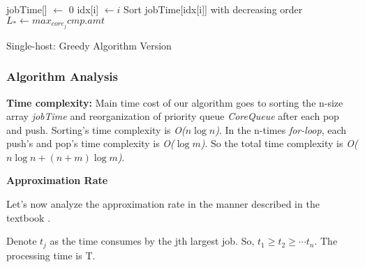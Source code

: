 \documentclass{article}
\begin{document}
    \begin{center}
        \begin{minipage}{15cm}
        \begin{algorithm}[H]
            \SetAlgoLined
            jobTime[] $\leftarrow$ 0 \; 
            idx[i] $\leftarrow i$\; 
            Sort jobTime[idx[i]] with decreasing order\; 
            $L_* \leftarrow max_{core_j} cmp.amt$\;
            

        \caption{Single-host: Greedy Algorithm Version}
        \end{algorithm}
        \end{minipage} 
        \end{center}
    
\subsubsection{Algorithm Analysis}
    \textbf{Time complexity:} Main time cost of our algorithm goes to sorting the n-size array \textit{jobTime} and reorganization of priority queue \textit{CoreQueue} after each pop and push. Sorting's time complexity is \textit{O($n \log n$)}. In the n-times \textit{for-loop}, each push's and pop's time complexity is \textit{O($\log m$)}. So the total time complexity is \textit{O($n \log n + (n + m) \log m$)}.
    
    \textbf{Approximation Rate}
    
    Let's now analyze the approximation rate in the manner described in the  textbook \cite{10.5555/1051910}.
    
    Denote $t_j$ as the time consumes by the jth largest job. So, $t_1 \geq t_2 \geq \cdots t_n$. The  processing time is T.
    
\end{document}
